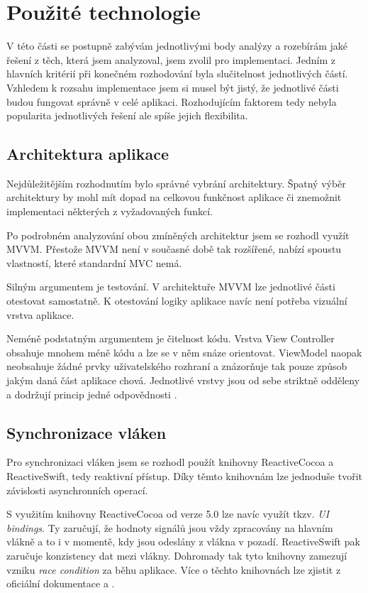 \section{Použité technologie}

V této části se postupně zabývám jednotlivými body analýzy a rozebírám jaké řešení z těch, která jsem analyzoval, jsem zvolil pro implementaci.
Jedním z hlavních kritérií při konečném rozhodování byla slučitelnost jednotlivých částí.
Vzhledem k rozsahu implementace jsem si musel být jistý, že jednotlivé části budou fungovat správně v celé aplikaci.
Rozhodujícím faktorem tedy nebyla popularita jednotlivých řešení ale spíše jejich flexibilita.

\subsection{Architektura aplikace}

Nejdůležitějším rozhodnutím bylo správné vybrání architektury.
Špatný výběr architektury by mohl mít dopad na celkovou funkčnost aplikace či znemožnit implementaci některých z vyžadovaných funkcí.

Po podrobném analyzování obou zmíněných architektur jsem se rozhodl využít MVVM.
Přestože MVVM není v současné době tak rozšířené, nabízí spoustu vlastností, které standardní MVC nemá.

Silným argumentem je testování.
V architektuře MVVM lze jednotlivé části otestovat samostatně.
K otestování logiky aplikace navíc není potřeba vizuální vrstva aplikace.

Neméně podstatným argumentem je čitelnost kódu.
Vrstva View Controller obsahuje mnohem méně kódu a lze se v něm snáze orientovat.
ViewModel naopak neobsahuje žádné prvky uživatelského rozhraní a znázorňuje tak pouze způsob jakým daná část aplikace chová.
Jednotlivé vrstvy jsou od sebe striktně odděleny a dodržují princip jedné odpovědnosti \cite{toptal-srp}.

\subsection{Synchronizace vláken}

Pro synchronizaci vláken jsem se rozhodl použít knihovny ReactiveCocoa a ReactiveSwift, tedy reaktivní přístup.
Díky těmto knihovnám lze jednoduše tvořit závislosti asynchronních operací.

S využitím knihovny ReactiveCocoa od verze 5.0 lze navíc využít tkzv. \textit{UI bindings}.
Ty zaručují, že hodnoty signálů jsou vždy zpracovány na hlavním vlákně a to i v momentě, kdy jsou odeslány z vlákna v pozadí.
ReactiveSwift pak zaručuje konzistency dat mezi vlákny.
Dohromady tak tyto knihovny zamezují vzniku \textit{race condition} za běhu aplikace.
Více o těchto knihovnách lze zjistit z oficiální dokumentace \cite{github-reactiveswift} a \cite{github-reactivecocoa}.

